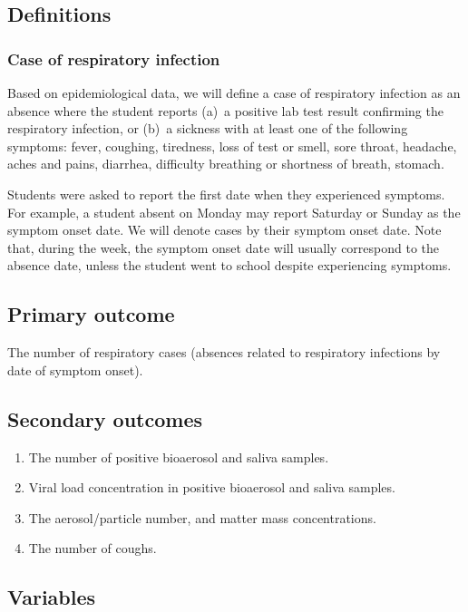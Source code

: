 \documentclass{article}
\begin{document}
\subsection{Definitions}

\subsubsection{Case of respiratory infection}

Based on epidemiological data, we will define a case of respiratory infection as an absence where the student reports (a)~a positive lab test result confirming the respiratory infection, or (b)~a sickness with at least one of the following symptoms: fever, coughing, tiredness, loss of test or smell, sore throat, headache, aches and pains, diarrhea, difficulty breathing or shortness of breath, stomach. 

Students were asked to report the first date when they experienced symptoms. For example, a student absent on Monday may report Saturday or Sunday as the symptom onset date. We will denote cases by their symptom onset date. Note that, during the week, the symptom onset date will usually correspond to the absence date, unless the student went to school despite experiencing symptoms.  

\subsection{Primary outcome}

The number of respiratory cases (absences related to respiratory infections by date of symptom onset).  


\subsection{Secondary outcomes}

\begin{enumerate}
    \item The number of positive bioaerosol and saliva samples.
    \item Viral load concentration in positive bioaerosol and saliva samples.
    \item The aerosol/particle number, and matter mass concentrations.
    \item The number of coughs.
\end{enumerate}

\subsection{Variables}
\end{document}
